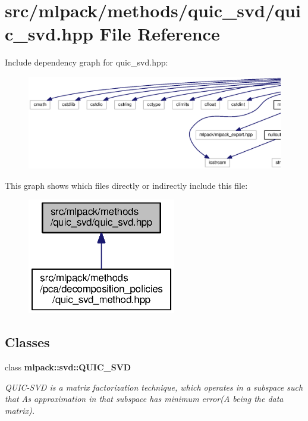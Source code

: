 \section{src/mlpack/methods/quic\+\_\+svd/quic\+\_\+svd.hpp File Reference}
\label{quic__svd_8hpp}
Include dependency graph for quic\+\_\+svd.\+hpp\+:
\nopagebreak
\begin{figure}[H]
\begin{center}
\leavevmode
\includegraphics[width=350pt]{quic__svd_8hpp__incl}
\end{center}
\end{figure}
This graph shows which files directly or indirectly include this file\+:
\nopagebreak
\begin{figure}[H]
\begin{center}
\leavevmode
\includegraphics[width=184pt]{quic__svd_8hpp__dep__incl}
\end{center}
\end{figure}
\subsection*{Classes}
\begin{DoxyCompactItemize}
\item 
class {\bf mlpack\+::svd\+::\+Q\+U\+I\+C\+\_\+\+S\+VD}
\begin{DoxyCompactList}\small\item\em Q\+U\+I\+C-\/\+S\+VD is a matrix factorization technique, which operates in a subspace such that A\textquotesingle{}s approximation in that subspace has minimum error(A being the data matrix). \end{DoxyCompactList}\end{DoxyCompactItemize}
